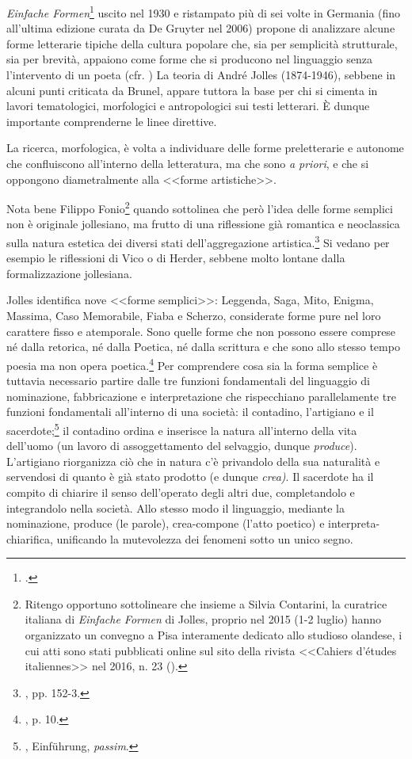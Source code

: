 \documentclass[12pt,a4paper,openright, oneside]{book}
\begin{document}
\textit{Einfache Formen}\footcite{Jolles} uscito nel 1930 e ristampato  più di sei volte in Germania (fino all'ultima edizione curata da De Gruyter nel 2006) propone di analizzare alcune forme letterarie tipiche della cultura popolare che, sia per semplicità strutturale, sia per brevità, appaiono come forme che si producono nel linguaggio senza l'intervento di un poeta (cfr. \cite{Jolles} ) La teoria di André Jolles (1874-1946), sebbene in alcuni punti criticata da Brunel, appare tuttora la base per chi si cimenta in lavori tematologici, morfologici e antropologici sui testi letterari. È dunque importante comprenderne le linee direttive.

La ricerca, morfologica, è volta a individuare delle forme preletterarie e autonome che confluiscono all'interno della letteratura, ma che sono \textit{a priori}, e che si oppongono diametralmente alla <<forme artistiche>>.

Nota bene Filippo Fonio\footnote{Ritengo opportuno sottolineare che insieme a Silvia Contarini, la curatrice italiana di \textit{Einfache Formen} di Jolles, proprio nel 2015 (1-2 luglio) hanno organizzato un convegno a Pisa interamente dedicato allo studioso olandese, i cui atti sono stati pubblicati online sul sito della rivista <<Cahiers d'études italiennes>> nel 2016, n. 23 (\cite{Fonio}).} quando sottolinea che però l'idea delle forme semplici non è originale jollesiano, ma frutto di una riflessione già romantica e neoclassica sulla natura estetica dei diversi stati dell'aggregazione artistica.\footnote{\cite{Fonio1}, pp. 152-3.} Si vedano per esempio le riflessioni di Vico o di Herder, sebbene molto lontane dalla formalizzazione jollesiana.

Jolles identifica nove <<forme semplici>>: Leggenda, Saga, Mito, Enigma, Massima, Caso Memorabile, Fiaba e Scherzo, considerate forme pure nel loro carattere fisso e atemporale. Sono quelle forme che non possono essere comprese né dalla retorica, né dalla Poetica, né dalla scrittura e che sono allo stesso tempo poesia ma non opera poetica.\footnote{\cite{Jolles}, p. 10.} Per comprendere cosa sia la forma semplice è tuttavia necessario partire dalle tre funzioni fondamentali del linguaggio di nominazione, fabbricazione e interpretazione che rispecchiano parallelamente tre funzioni fondamentali all'interno di una società: il contadino, l'artigiano e il sacerdote;\footnote{\cite{Jolles}, Einf\"uhrung, \textit{passim}.} il contadino ordina e inserisce la natura all'interno della vita dell'uomo (un lavoro di assoggettamento del selvaggio, dunque \textit{produce}). L'artigiano riorganizza ciò che in natura c'è privandolo della sua naturalità e servendosi di quanto è già stato prodotto (e dunque \textit{crea)}. Il sacerdote ha il compito di chiarire il senso dell'operato degli altri due, completandolo e integrandolo nella società.  Allo stesso modo il linguaggio, mediante la nominazione, produce (le parole), crea-compone (l'atto poetico) e interpreta-chiarifica, unificando la mutevolezza dei fenomeni sotto un unico segno.
\end{document}

